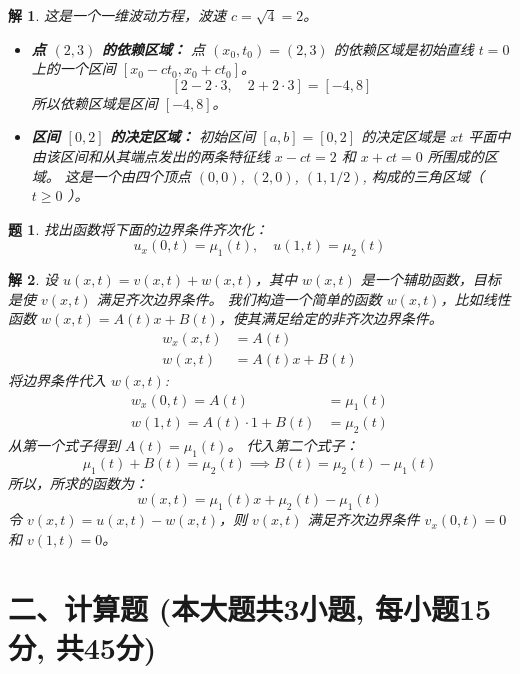\documentclass[12pt,a4paper]{article}
\newtheorem{problem}{题}
\newtheorem*{solution}{解}
\begin{document}
	\begin{solution}
		这是一个一维波动方程，波速 $c = \sqrt{4} = 2$。
		\begin{itemize}
			\item \textbf{点 $(2,3)$ 的依赖区域：}
			点 $(x_0, t_0) = (2, 3)$ 的依赖区域是初始直线 $t=0$ 上的一个区间 $[x_0 - ct_0, x_0 + ct_0]$。
			\[
			[2 - 2 \cdot 3, \quad 2 + 2 \cdot 3] = [-4, 8]
			\]
			所以依赖区域是区间 $[-4, 8]$。
			
			\item \textbf{区间 $[0,2]$ 的决定区域：}
			初始区间 $[a,b] = [0,2]$ 的决定区域是 $xt$ 平面中由该区间和从其端点发出的两条特征线 $x-ct=2$ 和 $x+ct=0$ 所围成的区域。
			这是一个由四个顶点 $(0,0)$, $(2,0)$, $(1, 1/2)$, 构成的三角区域（$t \ge 0$ ）。
		\end{itemize}
	\end{solution}
		\hrulefill
	\begin{problem}
		找出函数将下面的边界条件齐次化：
		\[ u_x(0,t) = \mu_1(t), \quad u(1,t) = \mu_2(t) \]
	\end{problem}
	\hrulefill
	\begin{solution}
		设 $u(x,t) = v(x,t) + w(x,t)$，其中 $w(x,t)$ 是一个辅助函数，目标是使 $v(x,t)$ 满足齐次边界条件。
		我们构造一个简单的函数 $w(x,t)$，比如线性函数 $w(x,t) = A(t)x + B(t)$，使其满足给定的非齐次边界条件。
		\begin{align*}
			w_x(x,t) &= A(t) \\
			w(x,t) &= A(t)x + B(t)
		\end{align*}
		将边界条件代入 $w(x,t)$:
		\begin{align*}
			w_x(0,t) = A(t) &= \mu_1(t) \\
			w(1,t) = A(t) \cdot 1 + B(t) &= \mu_2(t)
		\end{align*}
		从第一个式子得到 $A(t) = \mu_1(t)$。
		代入第二个式子：
		\[ \mu_1(t) + B(t) = \mu_2(t) \implies B(t) = \mu_2(t) - \mu_1(t) \]
		所以，所求的函数为：
		\[ w(x,t) = \mu_1(t)x + \mu_2(t) - \mu_1(t) \]
		令 $v(x,t) = u(x,t) - w(x,t)$，则 $v(x,t)$ 满足齐次边界条件 $v_x(0,t)=0$ 和 $v(1,t)=0$。
	\end{solution}
	
	\newpage
	\section*{二、计算题 (本大题共3小题, 每小题15分, 共45分)}
	
\end{document}
